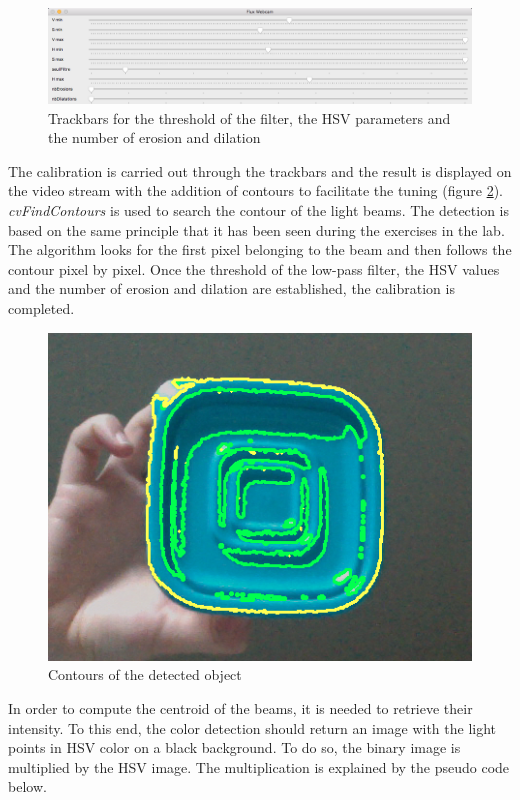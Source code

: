 \begin{figure}[H]
  \centering
  \includegraphics[scale=0.35]{fig/trackbars.png}
  \caption{Trackbars for the threshold of the filter, the HSV parameters and the number of erosion and dilation}
  \label{fig:trackbars}
\end{figure}

The calibration is carried out through the trackbars and the result is displayed on the video stream with the addition of contours to facilitate the tuning (figure \ref{fig:contours}). \textit{cvFindContours} is used to search the contour of the light beams. The detection is based on the same principle that it has been seen during the exercises in the lab. The algorithm looks for the first pixel belonging to the beam and then follows the contour pixel by pixel. Once the threshold of the low-pass filter, the HSV values and the number of erosion and dilation are established, the calibration is completed.

\begin{figure}[H]
  \centering
  \includegraphics[scale=0.6]{fig/contours.png}
  \caption{Contours of the detected object}
  \label{fig:contours}
\end{figure}

In order to compute the centroid of the beams, it is needed to retrieve their intensity. To this end, the color detection should return an image with the light points in HSV color on a black background. To do so, the binary image is multiplied by the HSV image. The multiplication is explained by the pseudo code below. 

